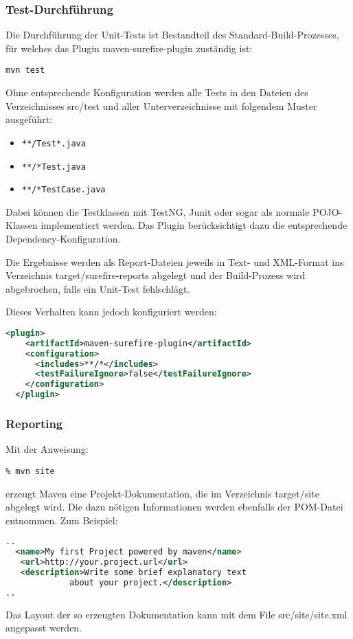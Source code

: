 \subsubsection{Test-Durchführung}
Die Durchführung der Unit-Tests ist Bestandteil des
Standard-Build-Prozesses, für welches das Plugin
maven-surefire-plugin zuständig ist:
\begin{lstlisting}
mvn test
\end{lstlisting}
Ohne entsprechende Konfiguration werden alle Tests in den Dateien des
Verzeichnisses src/test und aller Unterverzeichnisse mit folgendem
Muster ausgeführt:
\begin{itemize}
\item \verb+**/Test*.java+
\item \verb+**/*Test.java+
\item \verb+**/*TestCase.java+
\end{itemize}
Dabei können die Testklassen mit TestNG, Junit oder sogar
als normale POJO-Klassen
implementiert werden. Das Plugin berücksichtigt dazu die entsprechende
Dependency-Konfiguration.

Die Ergebnisse werden als
Report-Dateien jeweils in Text- und XML-Format ins Verzeichnis
target/surefire-reports abgelegt und der Build-Prozess wird
abgebrochen, falls ein Unit-Test fehlschlägt.

Dieses Verhalten kann jedoch konfiguriert werden:
\begin{lstlisting}[language=xml,
  morekeywords={plugin,groupId,artifactId,configuration,testFailureIgnore,includes}]
  <plugin>
    <artifactId>maven-surefire-plugin</artifactId>
    <configuration>
      <includes>**/*</includes>
      <testFailureIgnore>false</testFailureIgnore>
    </configuration>
  </plugin>
\end{lstlisting}
%
\newslide
\subsubsection{Reporting}
Mit der Anweisung:
\begin{lstlisting}
% mvn site
\end{lstlisting}
erzeugt Maven eine Projekt-Dokumentation, die im Verzeichnis target/site
abgelegt wird. Die dazu nötigen Informationen werden ebenfalls der
POM-Datei entnommen. Zum Beispiel:
\begin{lstlisting}[language=xml,morekeywords={name,url,description}]
..
  <name>My first Project powered by maven</name>
   <url>http://your.project.url</url>
   <description>Write some brief explanatory text
             about your project.</description>
..
\end{lstlisting}
Das Layout der so erzeugten Dokumentation
kann mit dem File src/site/site.xml angepasst werden.


